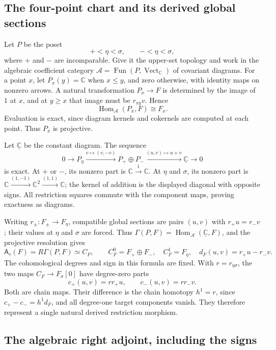 \subsection{The four-point chart and its derived global sections}
\label{app:chart-resolution}

Let \(P\) be the poset
\[
+<\eta<\sigma,\qquad -<\eta<\sigma,
\]
where \(+\) and \(-\) are incomparable. Give it the upper-set
topology and work in the algebraic coefficient category
\(\mathcal A=\operatorname{Fun}(P,\operatorname{Vect}_{\mathbb C})\)
of covariant diagrams. For a point \(x\), let \(P_x(y)=\mathbb C\)
when \(x\le y\), and zero otherwise, with identity maps on nonzero
arrows. A natural transformation \(P_x\to F\) is determined by the
image of \(1\) at \(x\), and at \(y\ge x\) that image must be
\(r_{xy}v\). Hence
\[
\operatorname{Hom}_{\mathcal A}(P_x,F)\cong F_x.
\]
Evaluation is exact, since diagram kernels and cokernels are
computed at each point. Thus \(P_x\) is projective.

Let \(\underline{\mathbb C}\) be the constant diagram. The sequence
\[
0\longrightarrow P_\eta
\xrightarrow{v\mapsto(v,-v)}P_+\oplus P_-
\xrightarrow{(u,v)\mapsto u+v}\underline{\mathbb C}
\longrightarrow0
\]
is exact. At \(+\) or \(-\), its nonzero part is
\(\mathbb C\xrightarrow{1}\mathbb C\). At \(\eta\) and \(\sigma\),
its nonzero part is
\(\mathbb C\xrightarrow{(1,-1)}\mathbb C^2
\xrightarrow{(1,1)}\mathbb C\); the kernel of addition is the
displayed diagonal with opposite signs. All restriction squares
commute with the component maps, proving exactness as diagrams.

Writing \(r_\pm:F_\pm\to F_\eta\), compatible global sections are
pairs \((u,v)\) with \(r_+u=r_-v\); their values at \(\eta\) and
\(\sigma\) are forced. Thus
\(\Gamma(P,F)=\operatorname{Hom}_{\mathcal A}
(\underline{\mathbb C},F)\), and the projective resolution gives
\[
\mathsf A_\tau(F)=R\Gamma(P,F)\simeq C_F,\qquad
C_F^0=F_+\oplus F_-,\quad C_F^1=F_\eta,\quad
d_F(u,v)=r_+u-r_-v.
\]
The cohomological degrees and sign in this formula are fixed.
With \(r=r_{\eta\sigma}\), the two maps \(C_F\to F_\sigma[0]\)
have degree-zero parts
\[
c_+(u,v)=rr_+u,\qquad c_-(u,v)=rr_-v.
\]
Both are chain maps. Their difference is the chain homotopy
\(h^1=r\), since \(c_+-c_-=h^1d_F\), and all degree-one target
components vanish. They therefore represent a single natural
derived restriction morphism.

\subsection{The algebraic right adjoint, including the signs}
\label{app:chart-adjunction}

